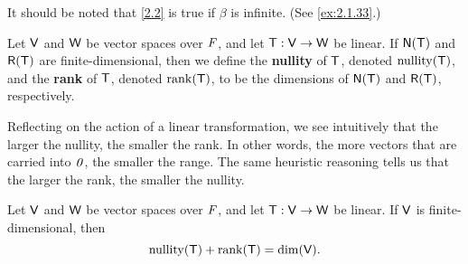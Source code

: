 \begin{note}
  It should be noted that \cref{2.2} is true if \(\beta\) is infinite.
  (See \cref{ex:2.1.33}.)
\end{note}

\begin{defn}\label{2.1.12}
  Let \(\mathsf{V}\) and \(\mathsf{W}\) be vector spaces over \(\mathit{F}\), and let \(\mathsf{T} : \mathsf{V} \to \mathsf{W}\) be linear.
  If \(\ns{\T}\) and \(\rg{\T}\) are finite-dimensional, then we define the \textbf{nullity} of \(\mathsf{T}\), denoted \(\nt{\T}\), and the \textbf{rank} of \(\mathsf{T}\), denoted \(\rk{\T}\), to be the dimensions of \(\ns{\T}\) and \(\rg{\T}\), respectively.
\end{defn}

\begin{note}
  Reflecting on the action of a linear transformation, we see intuitively that the larger the nullity, the smaller the rank.
  In other words, the more vectors that are carried into \(\mathit{0}\), the smaller the range.
  The same heuristic reasoning tells us that the larger the rank, the smaller the nullity.
\end{note}

\begin{thm}\label{2.3}
  Let \(\mathsf{V}\) and \(\mathsf{W}\) be vector spaces over \(\mathit{F}\), and let \(\mathsf{T} : \mathsf{V} \to \mathsf{W}\) be linear.
  If \(\mathsf{V}\) is finite-dimensional, then
  \[
    \nt{\T} + \rk{\T} = \dim(\V).
  \]
\end{thm}

